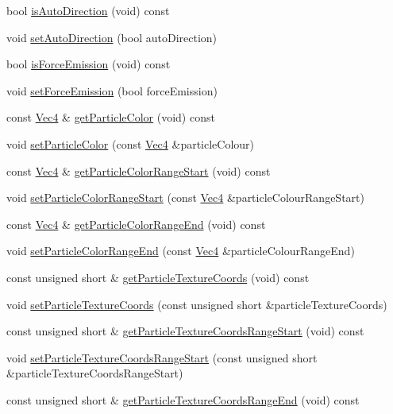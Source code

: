 \begin{DoxyCompactItemize}
bool \hyperlink{classPUEmitter_acfb3f499a7dc29652bdd7c9d6970a9e5}{is\+Auto\+Direction} (void) const
\item 
void \hyperlink{classPUEmitter_a063a09ad3ae10313e1f87555798ec362}{set\+Auto\+Direction} (bool auto\+Direction)
\item 
bool \hyperlink{classPUEmitter_aa19a7d986cdfd7204aba3910192e8e27}{is\+Force\+Emission} (void) const
\item 
void \hyperlink{classPUEmitter_a95b92d550215d868305629b7a79b244b}{set\+Force\+Emission} (bool force\+Emission)
\item 
const \hyperlink{classVec4}{Vec4} \& \hyperlink{classPUEmitter_a4e266dca3690b7b32afb7a6fcf7eb7ed}{get\+Particle\+Color} (void) const
\item 
void \hyperlink{classPUEmitter_a0d0e51b19fd247625f86ed120dc0fe94}{set\+Particle\+Color} (const \hyperlink{classVec4}{Vec4} \&particle\+Colour)
\item 
const \hyperlink{classVec4}{Vec4} \& \hyperlink{classPUEmitter_aeee3ac1b853918d874898247722f061c}{get\+Particle\+Color\+Range\+Start} (void) const
\item 
void \hyperlink{classPUEmitter_a90c804dc0561c3a3f19eb631e1c84646}{set\+Particle\+Color\+Range\+Start} (const \hyperlink{classVec4}{Vec4} \&particle\+Colour\+Range\+Start)
\item 
const \hyperlink{classVec4}{Vec4} \& \hyperlink{classPUEmitter_ac971bd9710f188afe3da5ac821d337ae}{get\+Particle\+Color\+Range\+End} (void) const
\item 
void \hyperlink{classPUEmitter_ad4631d131294b6a7148b7914335d0d4f}{set\+Particle\+Color\+Range\+End} (const \hyperlink{classVec4}{Vec4} \&particle\+Colour\+Range\+End)
\item 
const unsigned short \& \hyperlink{classPUEmitter_a6b402a0fcb4600bb53b77b67dd9c4bd8}{get\+Particle\+Texture\+Coords} (void) const
\item 
void \hyperlink{classPUEmitter_a400b39eba5fa388728c51eda60b11163}{set\+Particle\+Texture\+Coords} (const unsigned short \&particle\+Texture\+Coords)
\item 
const unsigned short \& \hyperlink{classPUEmitter_aa70c8f3a46679009d4ce4dc2cee74cd0}{get\+Particle\+Texture\+Coords\+Range\+Start} (void) const
\item 
void \hyperlink{classPUEmitter_a52c268b861b30c2870665e13df528015}{set\+Particle\+Texture\+Coords\+Range\+Start} (const unsigned short \&particle\+Texture\+Coords\+Range\+Start)
\item 
const unsigned short \& \hyperlink{classPUEmitter_a10c26379e8687bb43cc884d2c02ecfe9}{get\+Particle\+Texture\+Coords\+Range\+End} (void) const

\end{DoxyCompactItemize}

